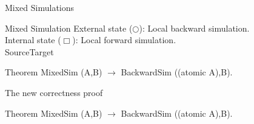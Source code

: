 \begin{frame}{Mixed Simulations}
  \begin{block}{Mixed Simulation}
    External state ($\bigcirc$): Local backward simulation.\\
    Internal state ($\Box$): Local forward simulation.\\
    {\color{blue}Source\hfill\color{red}Target}
    \vspace{-0.8cm}
    \mixed
  \end{block}
  \vfill
  \begin{block}{Theorem}
    MixedSim (A,B) $\rightarrow$ BackwardSim ((atomic A),B).
  \end{block}
\end{frame}

%
%
%
%
\begin{frame}{The new correctness proof}
  \proofmixed
  \vfill
  \begin{block}{Theorem}
    MixedSim (A,B) $\rightarrow$ BackwardSim ((atomic A),B).
  \end{block}
\end{frame}

